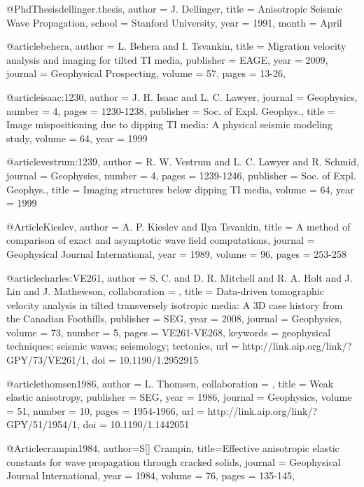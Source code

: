 @PhdThesis{dellinger.thesis,
  author =	 {J. Dellinger},
  title =	 {Anisotropic Seismic Wave Propagation},
  school =	 {Stanford University},
  year =	 1991,
  month =	 {April}
}

@article{behera,
  author =	 {L. Behera and I. Tsvankin},
  title =	 {Migration velocity analysis and imaging for tilted
                  {TI} media},
  publisher =	 {EAGE},
  year =	 2009,
  journal =	 {Geophysical Prospecting},
  volume =	 57,
  pages =	 {13-26},
}

@article{isaac:1230,
  author =	 {J. H. Isaac and L. C. Lawyer},
  journal =	 {Geophysics},
  number =	 4,
  pages =	 {1230-1238},
  publisher =	 {Soc. of Expl. Geophys.},
  title =	 {Image mispositioning due to dipping {TI} media: {A}
                  physical seismic modeling study},
  volume =	 64,
  year =	 1999
}

@article{vestrum:1239,
  author =	 {R. W. Vestrum and L. C. Lawyer and R. Schmid},
  journal =	 {Geophysics},
  number =	 4,
  pages =	 {1239-1246},
  publisher =	 {Soc. of Expl. Geophys.},
  title =	 {Imaging structures below dipping {TI} media},
  volume =	 64,
  year =	 1999
}

@Article{Kieslev,
  author =	 {A. P. Kieslev and Ilya Tsvankin},
  title =	 {A method of comparison of exact and asymptotic wave
                  field computations},
  journal =	 {Geophysical Journal International},
  year =	 1989,
  volume =	 96,
  pages =	 {253-258}
}

@article{charles:VE261,
author = {S. C. and D. R. Mitchell and R. A. Holt and
                  J. Lin and J. Mathewson},
collaboration = {},
title = {Data-driven tomographic velocity analysis in tilted
                  transversely isotropic media: A 3{D} case history from
                  the Canadian Foothills},
publisher = {SEG},
year = {2008},
journal = {Geophysics},
volume = {73},
number = {5},
pages = {VE261-VE268},
keywords = {geophysical techniques; seismic waves; seismology; tectonics},
url = {http://link.aip.org/link/?GPY/73/VE261/1},
doi = {10.1190/1.2952915}
}


@article{thomsen1986,
author = {L. Thomsen},
collaboration = {},
title = {Weak elastic anisotropy},
publisher = {SEG},
year = {1986},
journal = {Geophysics},
volume = {51},
number = {10},
pages = {1954-1966},
url = {http://link.aip.org/link/?GPY/51/1954/1},
doi = {10.1190/1.1442051}
}

@Article{crampin1984,
  author={S[] Crampin},
  title={Effective anisotropic elastic constants for wave propagation through cracked solids},
  journal = 	 {Geophysical Journal International},
  year = 	 1984,
  volume =	 76,
  pages =	 {135-145},
}

